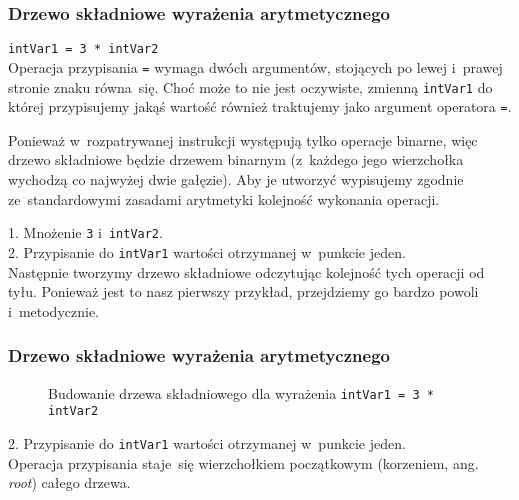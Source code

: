 \documentclass[10pt,t]{beamer}
\begin{document}
\begin{frame}
  \frametitle{Drzewo składniowe wyrażenia arytmetycznego}


  \texttt{intVar1 = 3 * intVar2} \\
  Operacja przypisania \texttt{=} wymaga dwóch argumentów, stojących po
  lewej i~prawej stronie znaku równa~się. Choć może to nie jest oczywiste,
  zmienną \texttt{intVar1} do której przypisujemy jakąś wartość również
  traktujemy jako argument operatora \texttt{=}.

  Ponieważ w~rozpatrywanej instrukcji występują tylko operacje binarne, więc
  drzewo składniowe będzie drzewem binarnym (z~każdego jego wierzchołka
  wychodzą co najwyżej dwie gałęzie). Aby je utworzyć wypisujemy zgodnie
  ze~standardowymi zasadami arytmetyki kolejność wykonania operacji.

  1. Mnożenie \texttt{3} i~\texttt{intVar2}. \\
  2. Przypisanie do \texttt{intVar1} wartości otrzymanej w~punkcie jeden. \\
  Następnie tworzymy drzewo składniowe odczytując kolejność tych operacji
  od tyłu. Ponieważ jest to nasz pierwszy przykład, przejdziemy go bardzo
  powoli i~metodycznie.

\end{frame}





\begin{frame}
  \frametitle{Drzewo składniowe wyrażenia arytmetycznego}


  \begin{figure}


    \caption{Budowanie drzewa składniowego dla wyrażenia
      \texttt{intVar1 = 3 * intVar2}}

    \label{fig:Scheme-of-CPU}

  \end{figure}





  2. Przypisanie do \texttt{intVar1} wartości otrzymanej w~punkcie jeden. \\
  Operacja przypisania staje~się wierzchołkiem początkowym (korzeniem, ang.
  \textit{root}) całego drzewa.

\end{frame}
\end{document}
